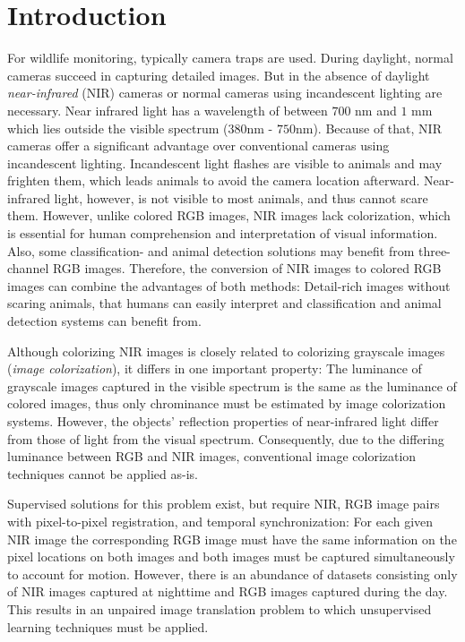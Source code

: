 \chapter{Introduction}
For wildlife monitoring, typically camera traps are used. During daylight, normal cameras succeed in capturing detailed images.
But in the absence of daylight \textit{near-infrared} (NIR) cameras or normal cameras using incandescent lighting are necessary.
Near infrared light has a wavelength of between $700$ nm and $1$ mm which lies outside the visible spectrum ($380$nm - $750$nm).  %
Because of that, NIR cameras offer a significant advantage over conventional cameras using incandescent lighting.
Incandescent light flashes are visible to animals and may frighten them, which leads animals to avoid the camera location afterward.
Near-infrared light, however, is not visible to most animals, and thus cannot scare them.
However, unlike colored RGB images, NIR images lack colorization, which is essential for human comprehension and interpretation of visual information.
Also, some classification- and animal detection solutions may benefit from three-channel RGB images.
Therefore, the conversion of NIR images to colored RGB images can combine the advantages of both methods:
Detail-rich images without scaring animals, that humans can easily interpret and classification and animal detection systems can benefit from.

Although colorizing NIR images is closely related to colorizing grayscale images (\textit{image colorization}), it differs in one important property:
The luminance of grayscale images captured in the visible spectrum is the same as the luminance of colored images, thus only chrominance must be estimated by image colorization systems.
However, the objects' reflection properties of near-infrared light differ from those of light from the visual spectrum.
Consequently, due to the differing luminance between RGB and NIR images, conventional image colorization techniques cannot be applied as-is.

Supervised solutions for this problem exist, but require NIR, RGB image pairs with pixel-to-pixel registration, and temporal synchronization:
For each given NIR image the corresponding RGB image must have the same information on the pixel locations on both images and both images must be captured simultaneously to account for motion.
However, there is an abundance of datasets consisting only of NIR images captured at nighttime and RGB images captured during the day.
This results in an unpaired image translation problem to which unsupervised learning techniques must be applied.

